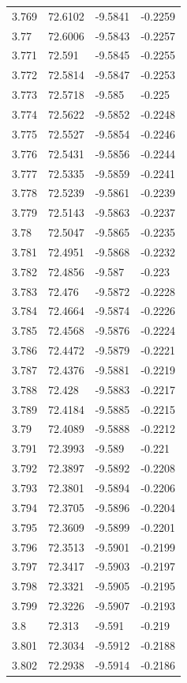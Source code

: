 \begin{tabular}{llll}
3.769 & 72.6102 & -9.5841 & -0.2259 \\
3.77 & 72.6006 & -9.5843 & -0.2257 \\
3.771 & 72.591 & -9.5845 & -0.2255 \\
3.772 & 72.5814 & -9.5847 & -0.2253 \\
3.773 & 72.5718 & -9.585 & -0.225 \\
3.774 & 72.5622 & -9.5852 & -0.2248 \\
3.775 & 72.5527 & -9.5854 & -0.2246 \\
3.776 & 72.5431 & -9.5856 & -0.2244 \\
3.777 & 72.5335 & -9.5859 & -0.2241 \\
3.778 & 72.5239 & -9.5861 & -0.2239 \\
3.779 & 72.5143 & -9.5863 & -0.2237 \\
3.78 & 72.5047 & -9.5865 & -0.2235 \\
3.781 & 72.4951 & -9.5868 & -0.2232 \\
3.782 & 72.4856 & -9.587 & -0.223 \\
3.783 & 72.476 & -9.5872 & -0.2228 \\
3.784 & 72.4664 & -9.5874 & -0.2226 \\
3.785 & 72.4568 & -9.5876 & -0.2224 \\
3.786 & 72.4472 & -9.5879 & -0.2221 \\
3.787 & 72.4376 & -9.5881 & -0.2219 \\
3.788 & 72.428 & -9.5883 & -0.2217 \\
3.789 & 72.4184 & -9.5885 & -0.2215 \\
3.79 & 72.4089 & -9.5888 & -0.2212 \\
3.791 & 72.3993 & -9.589 & -0.221 \\
3.792 & 72.3897 & -9.5892 & -0.2208 \\
3.793 & 72.3801 & -9.5894 & -0.2206 \\
3.794 & 72.3705 & -9.5896 & -0.2204 \\
3.795 & 72.3609 & -9.5899 & -0.2201 \\
3.796 & 72.3513 & -9.5901 & -0.2199 \\
3.797 & 72.3417 & -9.5903 & -0.2197 \\
3.798 & 72.3321 & -9.5905 & -0.2195 \\
3.799 & 72.3226 & -9.5907 & -0.2193 \\
3.8 & 72.313 & -9.591 & -0.219 \\
3.801 & 72.3034 & -9.5912 & -0.2188 \\
3.802 & 72.2938 & -9.5914 & -0.2186 \\

\end{tabular}
